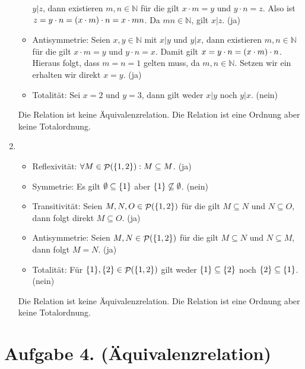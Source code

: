 \documentclass[german,12pt]{homework}
\newcommand{\NN}{\mathbb{N}}
\DeclareMathOperator{\pot}{\mathcal{P}}
\DeclarePairedDelimiter{\enbrace}{(}{)}
\DeclarePairedDelimiter{\penbrace}{\{}{\}}
\begin{document}
\begin{enumerate}
\begin{itemize}
            \(y | z\), dann existieren \(m, n \in \NN\) für die gilt \(x \cdot
            m = y\) und \(y \cdot n = z\). Also ist \(z = y \cdot n =
            \enbrace*{x \cdot m} \cdot n = x \cdot mn\). Da \(mn \in \NN\),
            gilt \(x | z\). (ja)
            \item Antisymmetrie: Seien \(x, y \in \NN\) mit \(x | y\) und \(y |
            x\), dann existieren \(m, n \in \NN\) für die gilt \(x \cdot m =
            y\) und \(y \cdot n = x\). Damit gilt \(x = y \cdot n = \enbrace*{x
            \cdot m} \cdot n\). Hieraus folgt, dass \(m = n = 1\) gelten muss,
            da \(m, n \in \NN\). Setzen wir ein erhalten wir direkt \(x = y\).
            (ja)
            \item Totalität: Sei \(x = 2\) und \(y = 3\), dann gilt weder \(x |
            y\) noch \(y | x\). (nein)
    	\end{itemize}
    	Die Relation ist keine Äquivalenzrelation. Die Relation ist eine
        Ordnung aber keine Totalordnung.
        \item\ \\
        \begin{itemize}
            \item Reflexivität: \({\forall}M \in \pot\enbrace*{\penbrace*{1,
            2}}: M \subseteq M\). (ja)
            \item Symmetrie: Es gilt \(\emptyset \subseteq \penbrace*{1}\) aber
            \(\penbrace*{1} \not\subseteq \emptyset\). (nein)
            \item Transitivität: Seien \(M, N, O \in
            \pot\enbrace*{\penbrace*{1, 2}}\) für die gilt \(M \subseteq N\)
            und \(N \subseteq O\), dann folgt direkt \(M \subseteq O\). (ja)
            \item Antisymmetrie: Seien \(M, N \in \pot\enbrace*{\penbrace*{1,
            2}}\) für die gilt \(M \subseteq N\) und \(N \subseteq M\), dann
            folgt \(M = N\). (ja)
            \item Totalität: Für \(\{1\}, \{2\} \in \pot\enbrace*{\penbrace*{1,
            2}}\) gilt weder \(\penbrace*{1} \subseteq \penbrace*{2}\) noch
            \(\penbrace*{2} \subseteq \penbrace*{1}\). (nein)
    	\end{itemize}
    	Die Relation ist keine Äquivalenzrelation. Die Relation ist eine
        Ordnung aber keine Totalordnung.
    \end{enumerate}

    \section*{Aufgabe 4. (Äquivalenzrelation)}
\end{document}

